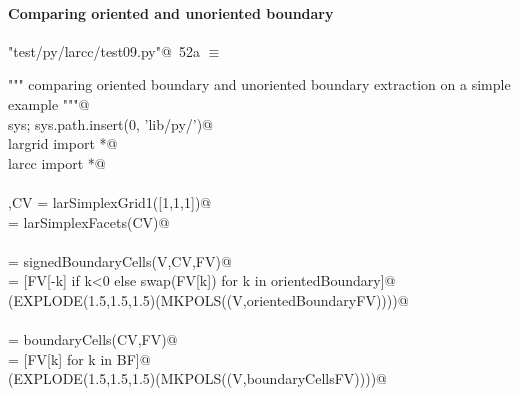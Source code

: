 \documentclass[11pt,oneside]{article}	%
\begin{document}
\paragraph{Comparing oriented and unoriented boundary}

\begin{flushleft} \small \label{scrap84}
\protect{}\verb@"test/py/larcc/test09.py"@\nobreak\ {\footnotesize 52a }$\equiv$
\vspace{-1ex}
\begin{list}{}{} \item
\mbox{}\verb@""" comparing oriented boundary and unoriented boundary extraction on a simple example """@\\
\mbox{}\verb@import sys; sys.path.insert(0, 'lib/py/')@\\
\mbox{}\verb@from largrid import *@\\
\mbox{}\verb@from larcc import *@\\
\mbox{}\verb@@\\
\mbox{}\verb@V,CV = larSimplexGrid1([1,1,1])@\\
\mbox{}\verb@FV = larSimplexFacets(CV)@\\
\mbox{}\verb@@\\
\mbox{}\verb@orientedBoundary = signedBoundaryCells(V,CV,FV)@\\
\mbox{}\verb@orientedBoundaryFV = [FV[-k] if k<0 else swap(FV[k]) for k in orientedBoundary]@\\
\mbox{}\verb@VIEW(EXPLODE(1.5,1.5,1.5)(MKPOLS((V,orientedBoundaryFV))))@\\
\mbox{}\verb@@\\
\mbox{}\verb@BF = boundaryCells(CV,FV)@\\
\mbox{}\verb@boundaryCellsFV = [FV[k] for k in BF]@\\
\mbox{}\verb@VIEW(EXPLODE(1.5,1.5,1.5)(MKPOLS((V,boundaryCellsFV))))@\\
\mbox{}\verb@@{\NWsep}
\end{list}
\vspace{-2ex}
\end{flushleft}
\end{document}
